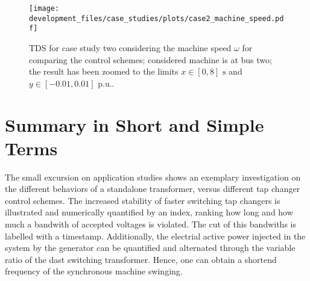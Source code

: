 \begin{figure}[htbp!]
    \centering
    \texttt{[image: development\_files/case\_studies/plots/case2\_machine\_speed.pdf]}
    \caption[\acs{TDS} for case study two considering the machine speed]{\acs{TDS} for case study two considering the machine speed $\omega$ for comparing the control schemes; considered machine is at bus two; the result has been zoomed to the limits $x \in [0,8]\text{ s}$ and $y \in [-0.01,0.01]\text{ p.u.}$.}
    \label{fig:case2-speed}
\end{figure}

\section{Summary in Short and Simple Terms}

The small excursion on application studies shows an exemplary investigation on the different behaviors of a standalone transformer, versus different tap changer control schemes.
The increased stability of faster switching tap changers is illustrated and numerically quantified by an index, ranking how long and how much a bandwith of accepted voltages is violated.
The cut of this bandwiths is labelled with a timestamp.
Additionally, the electrial active power injected in the system by the generator can be quantified and alternated through the variable ratio of the dast switching transformer.
Hence, one can obtain a shortend frequency of the synchronous machine swinging.
